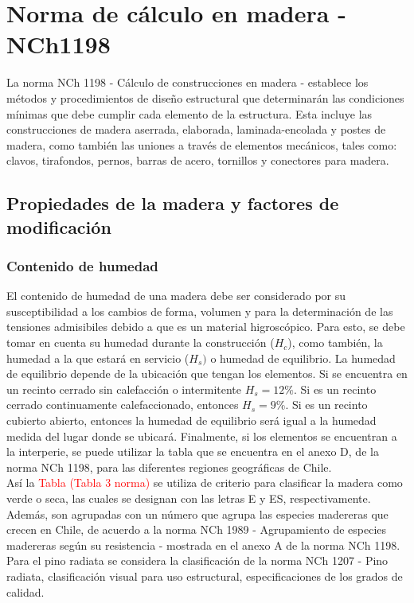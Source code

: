 %
\chapter{Norma de cálculo en madera - NCh1198}

La norma NCh 1198 - Cálculo de construcciones en madera - establece los métodos y procedimientos de diseño estructural que determinarán las condiciones mínimas que debe cumplir cada elemento de la estructura. Esta incluye las construcciones de madera aserrada, elaborada, laminada-encolada y postes de madera, como también las uniones a través de elementos mecánicos, tales como: clavos, tirafondos, pernos, barras de acero, tornillos y conectores para madera.

\section{Propiedades de la madera y factores de modificación}
\subsection{Contenido de humedad}


El contenido de humedad de una madera debe ser considerado por su susceptibilidad a los cambios de forma, volumen y para la determinación de las tensiones admisibiles debido a que es un material higroscópico. Para esto, se debe tomar en cuenta su humedad durante la construcción ($H_c$), como también, la humedad a la que estará en servicio ($H_s)$ o humedad de equilibrio. La humedad de equilibrio depende de la ubicación que tengan los elementos. Si se encuentra en un recinto cerrado sin calefacción o intermitente $H_s= 12\%$. Si es un recinto cerrado continuamente calefaccionado, entonces $H_s=9\%$. Si es un recinto cubierto abierto, entonces la humedad de equilibrio será igual a la humedad medida del lugar donde se ubicará. Finalmente, si los elementos se encuentran a la interperie, se puede utilizar la tabla que se encuentra en el anexo D, de la norma NCh 1198, para las diferentes regiones geográficas de Chile.\\

Así la \textcolor{red}{Tabla (Tabla 3 norma)} se utiliza de criterio para clasificar la madera como verde o seca, las cuales se designan con las letras E y ES, respectivamente. Además, son agrupadas con un número que agrupa las especies madereras que crecen en Chile, de acuerdo a la norma NCh 1989 - Agrupamiento de especies madereras según su resistencia - mostrada en el anexo A de la norma NCh 1198. Para el pino radiata se considera la clasificación de la norma NCh 1207 - Pino radiata, clasificación visual para uso estructural, especificaciones de los grados de calidad.\\

